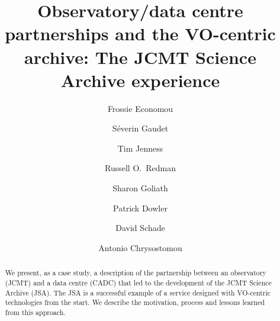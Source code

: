 \documentclass[final,authoryear,5p,times,twocolumn]{elsarticle}
\begin{document}
\begin{frontmatter}



\title{Observatory/data centre partnerships and the VO-centric archive:
  The JCMT Science Archive experience}


\author[lsst]{Frossie Economou}
\author[cadc]{S\'{e}verin Gaudet}
\author[cornell,jac]{Tim Jenness}
\author[jac]{Russell O.\ Redman}
\author[cadc]{Sharon Goliath}
\author[cadc]{Patrick Dowler}
\author[cadc]{David Schade}
\author[uherts,jac]{Antonio Chrysostomou}



\address[lsst]{LSST Project Office, 933 N.\ Cherry Ave, Tucson, AZ 85721, USA}
\address[cornell]{Department of Astronomy, Cornell University, Ithaca,
  NY 14853, USA}
\address[jac]{Joint Astronomy Centre, 660 N.\ A`oh\=ok\=u Place, Hilo, HI
  96720, USA}
\address[cadc]{Canadian Astronomy Data Centre, National Research Council of Canada, 5071 West Saanich Road., Victoria, BC V9E 2E7, Canada}
\address[uherts]{Centre for Astrophysics Research, University of Hertfordshire, College Lane, Hatfield, Hertfordshire AL10 9AB, UK}

\begin{abstract}

  We present, as a case study, a description of the
  partnership between an observatory (JCMT) and a data centre (CADC)
  that led to the development of the JCMT Science Archive (JSA). The
  JSA is a successful example of a service designed with VO-centric
  technologies from the start. We describe the motivation, process and
  lessons learned from this approach.


\end{abstract}
\end{frontmatter}
\end{document}
